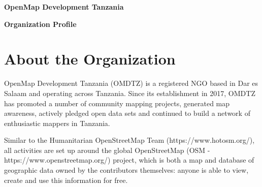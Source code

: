 \documentclass[a4paper,12pt,twoside]{article}
\begin{document}
  

\begin{center}
\vspace{5cm}
\Huge \color{OMDTZblue} \textbf {OpenMap Development Tanzania} 

\textbf{Organization Profile} 
    
\end{center}
\newpage

\newpage
\renewcommand{\baselinestretch}{1.3}\normalsize
\tableofcontents
\renewcommand{\baselinestretch}{1.0}\normalsize

\newpage

\section{About the Organization}
\label{abouttheorganization}

OpenMap Development Tanzania (OMDTZ) is a registered NGO based in Dar es Salaam and operating across Tanzania. Since its establishment in 2017, OMDTZ has promoted a number of community mapping projects, generated map awareness, actively pledged open data sets and continued to build a network of enthusiastic mappers in Tanzania. 

Similar to the Humanitarian OpenStreetMap Team (https://www.hotosm.org/), all activities are set up around the global OpenStreetMap (OSM - https://www.openstreetmap.org/) project, which is both a map and database of geographic data owned by the contributors themselves: anyone is able to view, create and use this information for free. 
\end{document}
